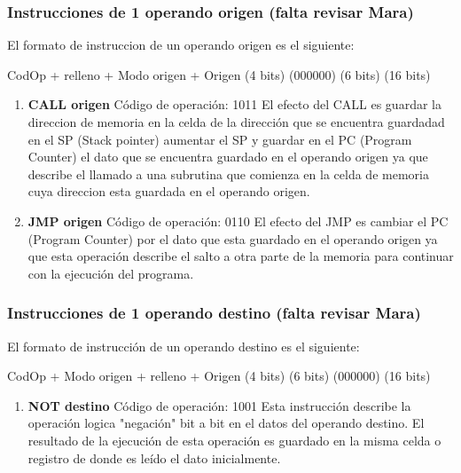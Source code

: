 \subsubsection{Instrucciones de 1 operando origen  (falta revisar Mara)}

El formato de instruccion de un operando origen es el siguiente:

  CodOp   +   relleno   +  Modo origen +   Origen
(4 bits)      (000000)        (6 bits)    (16 bits)

\begin{enumerate}
\item \textbf{CALL origen}
Código de operación: 1011
El efecto del CALL es guardar la direccion de memoria en la celda de la dirección que se encuentra guardadad en el SP (Stack pointer) aumentar el SP y guardar en el PC (Program Counter) el dato que se encuentra guardado en el operando origen ya que describe el llamado a una subrutina que comienza en la celda de memoria cuya direccion esta guardada en el operando origen.

\item \textbf{JMP origen}
Código de operación: 0110
El efecto del JMP es cambiar el PC (Program Counter) por el dato que esta guardado en el operando origen ya que esta operación describe el salto a otra parte de la memoria para continuar con la ejecución del programa.
\end{enumerate}

\subsubsection{Instrucciones de 1 operando destino  (falta revisar Mara)}

El formato de instrucción de un operando destino es el siguiente:

  CodOp   +  Modo origen  +  relleno  +  Origen
(4 bits)      (6 bits)      (000000)    (16 bits)

\begin{enumerate}
\item \textbf{NOT destino}
Código de operación: 1001
Esta instrucción describe la operación logica "negación" bit a bit en el datos del operando destino. El resultado de la ejecución de esta operación es guardado en la misma celda o registro de donde es leído el dato inicialmente.
\end{enumerate}

